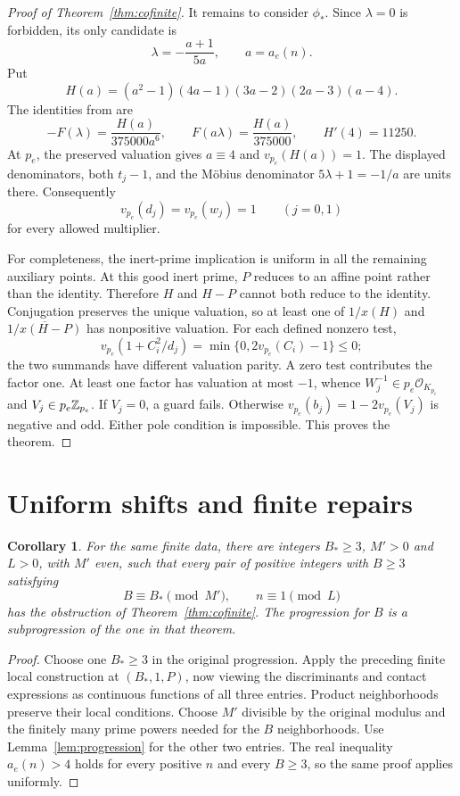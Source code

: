 \documentclass[11pt,a4paper]{article}
\newtheorem{corollary}[theorem]{Corollary}
\begin{document}
\begin{proof}[Proof of Theorem~\ref{thm:cofinite}]
It remains to consider $\phi_*$. Since $\lambda=0$ is forbidden,
its only candidate is
\[
              \lambda=-\frac{a+1}{5a},\qquad a=a_e(n).
\]
Put
\[
 H(a)=(a^2-1)(4a-1)(3a-2)(2a-3)(a-4).
\]
The identities from \cite[Section~3]{Mobius} are
\[
 -F(\lambda)=\frac{H(a)}{375000a^6},\qquad
 F(a\lambda)=\frac{H(a)}{375000},\qquad H'(4)=11250.
\]
At $p_e$, the preserved valuation gives $a\equiv4$ and
$v_{p_e}(H(a))=1$. The displayed denominators, both
$t_j-1$, and the M\"obius denominator $5\lambda+1=-1/a$
are units there. Consequently
\[
                 v_{p_e}(d_j)=v_{p_e}(w_j)=1\qquad(j=0,1)
\]
for every allowed multiplier.

For completeness, the inert-prime implication is uniform in all
the remaining auxiliary points. At this good inert prime, $P$
reduces to an affine point rather than the identity. Therefore
$H$ and $H-P$ cannot both reduce to the identity. Conjugation
preserves the unique valuation, so at least one of
$1/x(H)$ and $\overline{1/x(H-P)}$ has nonpositive valuation.
For each defined nonzero test,
\[
 v_{p_e}(1+C_i^2/d_j)=\min\{0,2v_{p_e}(C_i)-1\}\le0;
\]
the two summands have different valuation parity. A zero test
contributes the factor one. At least one factor has valuation
at most $-1$, whence $W_j^{-1}\in p_e\mathcal O_{K_{p_e}}$
and $V_j\in p_e\mathbb Z_{p_e}$. If $V_j=0$, a guard fails.
Otherwise $v_{p_e}(b_j)=1-2v_{p_e}(V_j)$ is negative and odd.
Either pole condition is impossible. This proves the theorem.
\end{proof}

\section{Uniform shifts and finite repairs}

\begin{corollary}\label{cor:uniform}
For the same finite data, there are integers $B_*\ge3$, $M'>0$
and $L>0$, with $M'$ even, such that every pair of positive
integers with $B\ge3$ satisfying
\[
               B\equiv B_*\pmod{M'},\qquad n\equiv1\pmod L
\]
has the obstruction of Theorem~\ref{thm:cofinite}.
The progression for $B$ is a subprogression of the one in that theorem.
\end{corollary}
\begin{proof}
Choose one $B_*\ge3$ in the original progression. Apply the
preceding finite local construction at $(B_*,1,P)$, now viewing
the discriminants and contact expressions as continuous functions
of all three entries. Product neighborhoods preserve their local
conditions. Choose $M'$ divisible by the original modulus and
the finitely many prime powers needed for the $B$ neighborhoods.
Use Lemma~\ref{lem:progression} for the other two entries.
The real inequality $a_e(n)>4$ holds for every positive $n$ and
every $B\ge3$, so the same proof applies uniformly.
\end{proof}
\end{document}
